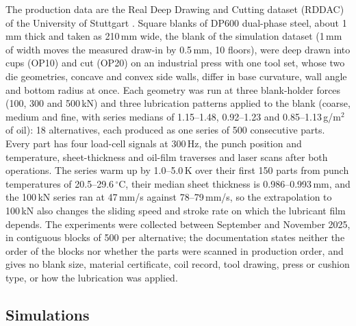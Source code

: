 \documentclass[pdflatex,sn-basic,lineno]{sn-jnl}
\begin{document}
The production data are the Real Deep Drawing and Cutting dataset (RDDAC) of the University of Stuttgart \citep{baum2026rddac, baum2026statistical}. Square blanks of DP600 dual-phase steel, about 1\,mm thick and taken as 210\,mm wide, the blank of the simulation dataset (1\,mm of width moves the measured draw-in by 0.5\,mm, 10 floors), were deep drawn into cups (OP10) and cut (OP20) on an industrial press with one tool set, whose two die geometries, concave and convex side walls, differ in base curvature, wall angle and bottom radius at once. Each geometry was run at three blank-holder forces (100, 300 and 500\,kN) and three lubrication patterns applied to the blank (coarse, medium and fine, with series medians of 1.15--1.48, 0.92--1.23 and 0.85--1.13\,g/m$^2$ of oil): 18 alternatives, each produced as one series of 500 consecutive parts. Every part has four load-cell signals at 300\,Hz, the punch position and temperature, sheet-thickness and oil-film traverses and laser scans after both operations. The series warm up by 1.0--5.0\,K over their first 150 parts from punch temperatures of 20.5--29.6\,$^\circ$C, their median sheet thickness is 0.986--0.993\,mm, and the 100\,kN series ran at 47\,mm/s against 78--79\,mm/s, so the extrapolation to 100\,kN also changes the sliding speed and stroke rate on which the lubricant film depends. The experiments were collected between September and November 2025, in contiguous blocks of 500 per alternative; the documentation states neither the order of the blocks nor whether the parts were scanned in production order, and gives no blank size, material certificate, coil record, tool drawing, press or cushion type, or how the lubrication was applied.

\subsection{Simulations}\label{sec:sims}
\end{document}
